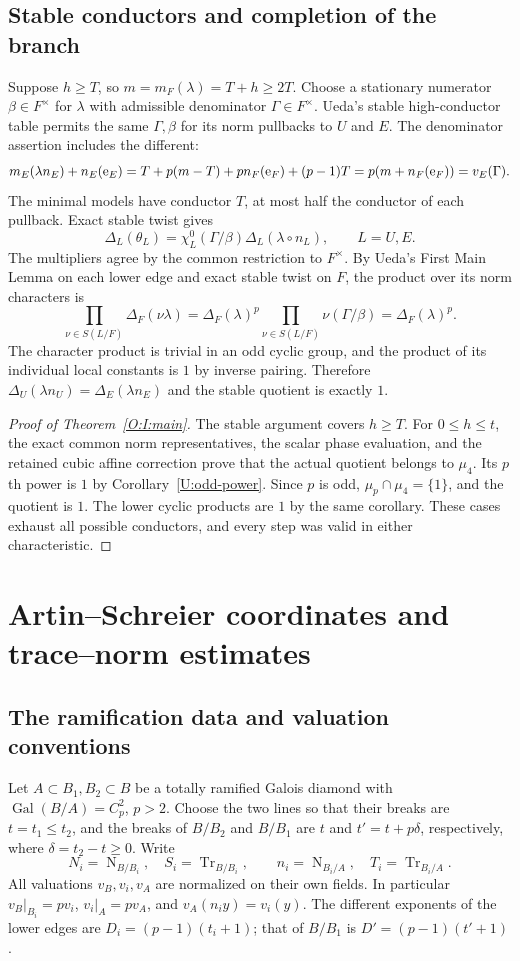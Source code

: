 \documentclass[11pt]{amsart}
\theoremstyle{definition}
\theoremstyle{remark}
\newcommand{\Tr}{\operatorname{Tr}}
\newcommand{\Nm}{\operatorname{N}}
\begin{document}
\subsection{Stable conductors and completion of the branch}
Suppose $h\ge T$, so $m=m_F(\lambda)=T+h\ge2T$.
Choose a stationary numerator $\beta\in F^\times$ for $\lambda$ with
admissible denominator $\Gamma\in F^\times$. Ueda's stable high-conductor
table permits the same $\Gamma,\beta$ for its norm pullbacks to $U$ and
$E$. The denominator assertion includes the different:
\[
 m_E(\lambda n_E)+n_E(\mathrm e_E)
 =T+p(m-T)+p n_F(\mathrm e_F)+(p-1)T
 =p(m+n_F(\mathrm e_F))=v_E(\Gamma).
\]
The minimal models have conductor $T$, at most half the conductor of each
pullback. Exact stable twist gives
\[
 \Delta_L(\theta_L)=\chi_L^0(\Gamma/\beta)
       \Delta_L(\lambda\circ n_L),\qquad L=U,E.
\]
The multipliers agree by the common restriction to $F^\times$.
By Ueda's First Main Lemma on each lower edge and exact stable twist
on $F$, the product over its norm characters is
\[
 \prod_{\nu\in S(L/F)}\Delta_F(\nu\lambda)
 =\Delta_F(\lambda)^p
   \prod_{\nu\in S(L/F)}\nu(\Gamma/\beta)
 =\Delta_F(\lambda)^p.
\]
The character product is trivial in an odd cyclic group, and the product
of its individual local constants is $1$ by inverse pairing. Therefore
$\Delta_U(\lambda n_U)=\Delta_E(\lambda n_E)$ and the stable quotient
is exactly $1$.

\begin{proof}[Proof of Theorem~\ref{O:I:main}]
The stable argument covers $h\ge T$. For $0\le h\le t$, the exact common
norm representatives, the scalar phase evaluation, and the retained cubic
affine correction prove that the actual quotient belongs to $\mu_4$.
Its $p$th power is $1$ by Corollary~\ref{U:odd-power}. Since $p$ is odd,
$\mu_p\cap\mu_4=\{1\}$, and the quotient is $1$.
The lower cyclic products are $1$ by the same corollary. These cases exhaust
all possible conductors, and every step was valid in either characteristic.
\end{proof}


\section{Artin--Schreier coordinates and trace--norm estimates}\label{O:sec:as}\label{sec:odd-estimates}
\subsection{The ramification data and valuation conventions}
Let $A\subset B_1,B_2\subset B$ be a totally ramified Galois diamond with
$\operatorname{Gal}(B/A)=C_p^2$, $p>2$.  Choose the two lines so that their
breaks are $t=t_1\le t_2$, and the breaks of $B/B_2$ and $B/B_1$ are
$t$ and $t'=t+p\delta$, respectively, where $\delta=t_2-t\ge0$.
Write
\[
 N_i=\Nm_{B/B_i},\quad S_i=\Tr_{B/B_i},\qquad
 n_i=\Nm_{B_i/A},\quad T_i=\Tr_{B_i/A}.
\]
All valuations $v_B,v_i,v_A$ are normalized on their own fields.  In
particular $v_B|_{B_i}=pv_i$, $v_i|_A=pv_A$, and
$v_A(n_i y)=v_i(y)$.
The different exponents of the lower edges are
$D_i=(p-1)(t_i+1)$; that of $B/B_1$ is $D'=(p-1)(t'+1)$.
\end{document}
